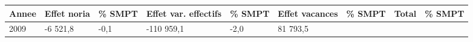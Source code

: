 \begin{longtable}[]{@{}lllllllll@{}}
\toprule
\begin{minipage}[b]{0.05\columnwidth}\raggedright
Annee\strut
\end{minipage} & \begin{minipage}[b]{0.10\columnwidth}\raggedright
Effet noria\strut
\end{minipage} & \begin{minipage}[b]{0.06\columnwidth}\raggedright
\% SMPT\strut
\end{minipage} & \begin{minipage}[b]{0.17\columnwidth}\raggedright
Effet var. effectifs\strut
\end{minipage} & \begin{minipage}[b]{0.06\columnwidth}\raggedright
\% SMPT\strut
\end{minipage} & \begin{minipage}[b]{0.12\columnwidth}\raggedright
Effet vacances\strut
\end{minipage} & \begin{minipage}[b]{0.06\columnwidth}\raggedright
\% SMPT\strut
\end{minipage} & \begin{minipage}[b]{0.08\columnwidth}\raggedright
Total\strut
\end{minipage} & \begin{minipage}[b]{0.06\columnwidth}\raggedright
\% SMPT\strut
\end{minipage}\tabularnewline
\midrule
\endhead
\begin{minipage}[t]{0.05\columnwidth}\raggedright
2009\strut
\end{minipage} & \begin{minipage}[t]{0.10\columnwidth}\raggedright
-6 521,8\strut
\end{minipage} & \begin{minipage}[t]{0.06\columnwidth}\raggedright
-0,1\strut
\end{minipage} & \begin{minipage}[t]{0.17\columnwidth}\raggedright
-110 959,1\strut
\end{minipage} & \begin{minipage}[t]{0.06\columnwidth}\raggedright
-2,0\strut
\end{minipage} & \begin{minipage}[t]{0.12\columnwidth}\raggedright
81 793,5\strut
\end{minipage} & \begin{minipage}[t]{0.06\columnwidth}\raggedright

\end{minipage}
\end{longtable}
